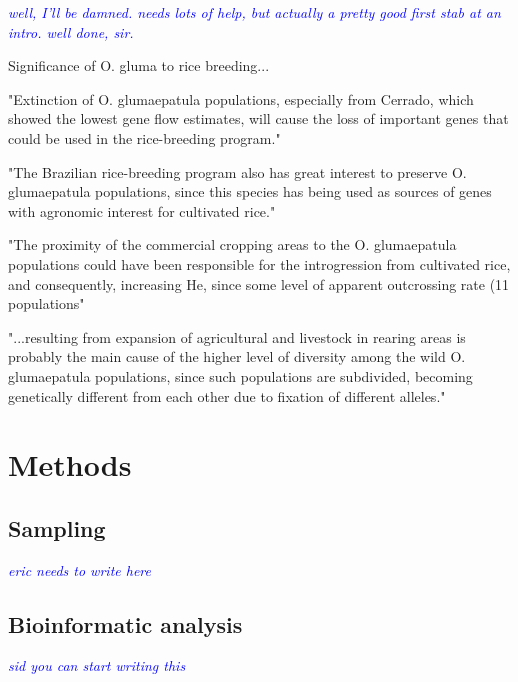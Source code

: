 \documentclass[11pt]{article} %
\newcommand{\jri}[1]{\textcolor{blue}{ \emph{\scriptsize  #1}} } %
\begin{document}
\begin{linenumbers}
\jri{well, I'll be damned. needs lots of help, but actually a pretty good first stab at an intro. well done, sir.}

Significance of O. gluma to rice breeding...

"Extinction of O. glumaepatula populations, especially from Cerrado,
which showed the lowest gene flow estimates, will cause the loss of 
important genes that could be used in the rice-breeding program."
\cite{brondani2005}

"The Brazilian rice-breeding
program also has great interest to preserve
O. glumaepatula populations, since this species has
being used as sources of genes with agronomic
interest for cultivated rice."
\cite{brondani2005}

"The proximity of the
commercial cropping areas to the O. glumaepatula
populations could have been responsible for the
introgression from cultivated rice, and consequently,
increasing He, since some level of apparent
outcrossing rate (11%
populations"
\cite{brondani2005}

"...resulting from expansion of agricultural
and livestock in rearing areas is probably the
main cause of the higher level of diversity among
the wild O. glumaepatula populations, since such
populations are subdivided, becoming genetically
different from each other due to fixation of different
alleles."
\cite{brondani2005}



\section*{Methods}
\subsection*{Sampling}
\jri{eric needs to write here}
\subsection*{Bioinformatic analysis}
\jri{sid you can start writing this}

\clearpage



\end{linenumbers}
\end{document}
